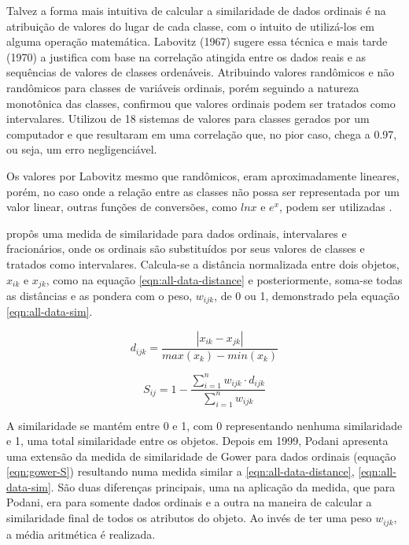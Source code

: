 \documentclass[preprint,12pt]{elsarticle}
\begin{document}
Talvez a forma mais intuitiva de calcular a similaridade de dados ordinais é na atribuição de valores do lugar de cada classe, com o intuito de utilizá-los em alguma operação matemática. Labovitz (1967) \cite{labovitz-1967-observation-statistics} sugere essa técnica e mais tarde (1970) \cite{assignment-rank-order-1970} a justifica com base na correlação atingida entre os dados reais e as sequências de valores de classes ordenáveis. Atribuindo valores randômicos e não randômicos para classes de variáveis ordinais, porém seguindo a natureza monotônica das classes, confirmou que valores ordinais podem ser tratados como intervalares. Utilizou de 18 sistemas de valores para classes gerados por um computador e que resultaram em uma correlação que, no pior caso, chega a 0.97, ou seja, um erro negligenciável. 

Os valores por Labovitz \cite{assignment-rank-order-1970} mesmo que randômicos, eram aproximadamente lineares, porém, no caso onde a relação entre as classes não possa ser representada por um valor linear, outras funções de conversões, como $ln x$ e $e^x$, podem ser utilizadas \cite{assignment-rank-order-1970}.

\cite{analysis-cluster} propôs uma medida de similaridade para dados ordinais, intervalares e fracionários, onde os ordinais são substituídos por seus valores de classes e tratados como intervalares. Calcula-se a distância normalizada entre dois objetos, $x_{ik}$ e $x_{jk}$, como na equação \ref{eqn:all-data-distance} e posteriormente, soma-se todas as distâncias e as pondera com o peso, $w_{ijk}$, de 0 ou 1, demonstrado pela equação \ref{eqn:all-data-sim}.

\begin{equation}
\label{eqn:all-data-distance}
    d_{ijk} =  \frac{|x_{ik} - x_{jk}|}{max(x_k) - min(x_k)}
\end{equation}

\begin{equation}
\label{eqn:all-data-sim}
    S_{ij} = 1 - \frac{\sum^n_{i=1} w_{ijk} \cdot d_{ijk}}{\sum^n_{i=1} w_{ijk}}
\end{equation}

A similaridade se mantém entre 0 e 1, com 0 representando nenhuma similaridade e 1, uma total similaridade entre os objetos. Depois em 1999, Podani \cite{extending-gower-ordinal} apresenta uma extensão da medida de similaridade de Gower para dados ordinais (equação \ref{eqn:gower-S}) resultando numa medida similar a \ref{eqn:all-data-distance}, \ref{eqn:all-data-sim}. São duas diferenças principais, uma na aplicação da medida, que para Podani, era para somente dados ordinais e a outra na maneira de calcular a similaridade final de todos os atributos do objeto. Ao invés de ter uma peso $w_{ijk}$, a média aritmética é realizada.
\end{document}
